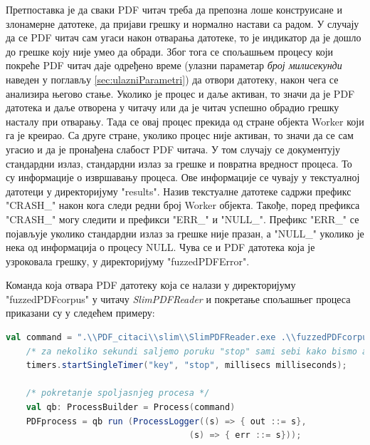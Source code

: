 \documentclass[12pt,oneside]{memoir}
\begin{document}
Претпоставка је да сваки PDF читач треба да препозна лоше конструисане и злонамерне датотеке, да пријави грешку и нормално настави са радом. У случају да се PDF читач сам угаси након отварања датотеке, то је индикатор да је дошло до грешке коју није умео да обради. Због тога се спољашњем процесу који покреће PDF читач даје одређено време (улазни параметар \textit{број милисекунди} наведен у поглављу \ref{sec:ulazniParametri}) да отвори датотеку, након чега се анализира његово стање. Уколико је процес и даље активан, то значи да је PDF датотека и даље отворена у читачу или да је читач успешно обрадио грешку насталу при отварању. Тада се овај процес прекида од стране објекта Worker који га је креирао. Са друге стране, уколико процес није активан, то значи да се сам угасио и да је пронађена слабост PDF читача. У том случају се документују стандардни излаз, стандардни излаз за грешке и повратна вредност процеса. То су информације о извршавању процеса. Ове информације се чувају у текстуалној датотеци у директоријуму "results". Назив текстуалне датотеке садржи префикс "CRASH\_" након кога следи редни број Worker објекта. Такође, поред префикса "CRASH\_" могу следити и префикси "ERR\_" и "NULL\_". Префикс "ERR\_" се појављује уколико стандардни излаз за грешке није празан, а "NULL\_" уколико је нека од информација о процесу NULL. Чува се и PDF датотека која је узроковала грешку, у директоријуму "fuzzedPDFError".

Команда која отвара PDF датотеку која се налази у директоријуму "fuzzedPDFcorpus" у читачу \textit{SlimPDFReader} и покретање спољашњег процеса приказани су у следећем примеру:

\begin{lstlisting}[frame=single, language=Scala]
    val command = ".\\PDF_citaci\\slim\\SlimPDFReader.exe .\\fuzzedPDFcorpus\\" + numberComplete +               "_fuzzed.pdf";
    /* za nekoliko sekundi saljemo poruku "stop" sami sebi kako bismo analizirali stanje procesa */
    timers.startSingleTimer("key", "stop", millisecs milliseconds);

    /* pokretanje spoljasnjeg procesa */
    val qb: ProcessBuilder = Process(command)
    PDFprocess = qb run (ProcessLogger((s) => { out ::= s},
	    					        (s) => { err ::= s}));
\end{lstlisting}
\end{document}
